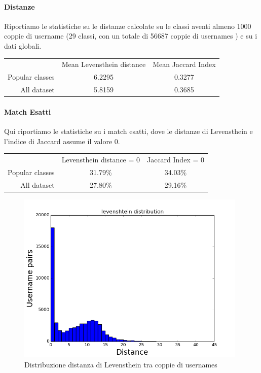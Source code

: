 \paragraph{Distanze}
Riportiamo le statistiche su le distanze calcolate su le classi aventi almeno 1000 coppie di username (29 classi, con un totale di 56687 coppie di usernames ) e su i dati globali.
\newline

\begin{tabular}{ r|c|c| }
\multicolumn{1}{r}{}
 &  \multicolumn{1}{c}{Mean Levensthein distance}
 & \multicolumn{1}{c}{Mean Jaccard Index} \\
\cline{2-3}
Popular classes & 6.2295 & 0.3277\\
\cline{2-3}
All dataset & 5.8159 & 0.3685 \\
\cline{2-3}
\end{tabular}

\paragraph{Match Esatti} Qui riportiamo le statistiche su i match esatti, dove le distanze di Levensthein e l'indice di Jaccard assume il valore 0.
\newline

\begin{tabular}{ r|c|c| }
\multicolumn{1}{r}{}
 &  \multicolumn{1}{c}{Levensthein distance = 0}
 & \multicolumn{1}{c}{Jaccard Index = 0 } \\
\cline{2-3}
Popular classes & 31.79\% & 34.03\% \\
\cline{2-3}
All dataset & 27.80\% & 29.16\% \\
\cline{2-3}
\end{tabular}

\begin{figure}[bp!]
\centering
\includegraphics[width=110mm]{chapters/distanceplot/levenshtein_distribution.png}
\caption{Distribuzione distanza di Levensthein tra coppie di usernames  \label{overflow}}
\end{figure}

